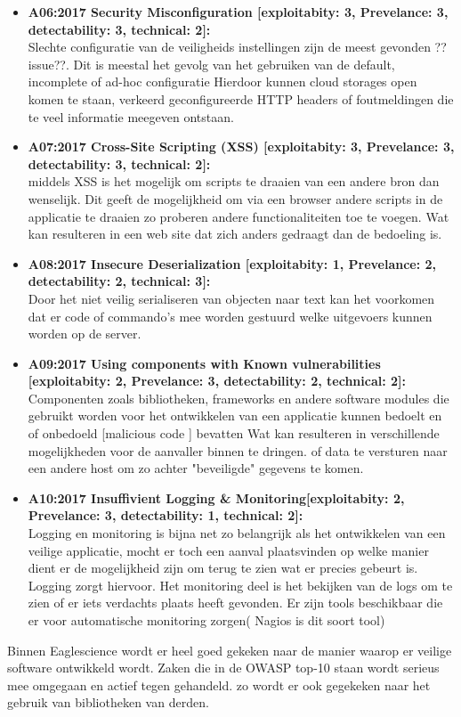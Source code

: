 \begin{itemize}
\item \textbf{A06:2017 Security Misconfiguration [exploitabity: 3, Prevelance: 3, detectability: 3, technical: 2]:}\\
Slechte configuratie van de veiligheids instellingen zijn de meest gevonden ??issue??. Dit is meestal het gevolg van het gebruiken van de default, incomplete of ad-hoc configuratie Hierdoor kunnen cloud storages open komen te staan, verkeerd geconfigureerde HTTP headers of foutmeldingen die te veel informatie meegeven ontstaan.

\item \textbf{A07:2017 Cross-Site Scripting (XSS) [exploitabity: 3, Prevelance: 3, detectability: 3, technical: 2]:}\\ middels XSS is het mogelijk om scripts te draaien van een andere bron dan wenselijk. Dit geeft de mogelijkheid om via een browser andere scripts in de applicatie te draaien zo proberen andere functionaliteiten toe te voegen. Wat kan resulteren in een web site dat zich anders gedraagt dan de bedoeling is.

\item \textbf{A08:2017 Insecure Deserialization [exploitabity: 1, Prevelance: 2, detectability: 2, technical: 3]:}\\ Door het niet veilig serialiseren van objecten naar text kan het voorkomen dat er code of commando's mee worden gestuurd welke uitgevoers kunnen worden op de server.

\item \textbf{A09:2017 Using components with Known vulnerabilities [exploitabity: 2, Prevelance: 3, detectability: 2, technical: 2]:}\\
Componenten zoals bibliotheken, frameworks en andere software modules die gebruikt worden voor het ontwikkelen van een applicatie kunnen bedoelt en of onbedoeld [malicious code ] bevatten Wat kan resulteren in verschillende mogelijkheden voor de aanvaller binnen te dringen. of data te versturen naar een andere host om zo achter "beveiligde" gegevens te komen.

\item \textbf{A10:2017 Insuffivient Logging \& Monitoring[exploitabity: 2, Prevelance: 3, detectability: 1, technical: 2]:}\\
Logging en monitoring is bijna net zo belangrijk als het ontwikkelen van een veilige applicatie, mocht er toch een aanval plaatsvinden op welke manier dient er de mogelijkheid zijn om terug te zien wat er precies gebeurt is. Logging zorgt hiervoor. Het monitoring deel is het bekijken van de logs om te zien of er iets verdachts plaats heeft gevonden. Er zijn tools beschikbaar die er voor automatische monitoring zorgen( Nagios is dit soort tool)

\end{itemize}
Binnen Eaglescience wordt er heel goed gekeken naar de manier waarop er veilige software ontwikkeld wordt. Zaken die in de OWASP top-10 staan wordt serieus mee omgegaan en actief tegen gehandeld. zo wordt er ook gegekeken naar het gebruik van bibliotheken van derden.

